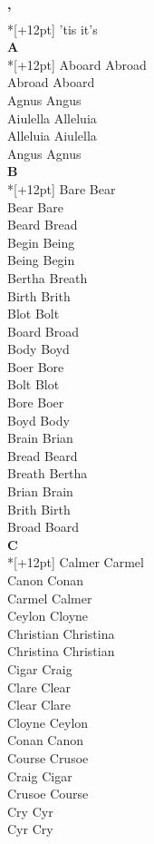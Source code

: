 
\vspace{14pt}
\noindent\textbf{\Large '}\\*[+12pt]
'tis it's\\

\vspace{14pt}
\noindent\textbf{\Large A}\\*[+12pt]
Aboard Abroad\\
Abroad Aboard\\
Agnus Angus\\
Aiulella Alleluia\\
Alleluia Aiulella\\
Angus Agnus\\

\vspace{14pt}
\noindent\textbf{\Large B}\\*[+12pt]
Bare Bear\\
Bear Bare\\
Beard Bread\\
Begin Being\\
Being Begin\\
Bertha Breath\\
Birth Brith\\
Blot Bolt\\
Board Broad\\
Body Boyd\\
Boer Bore\\
Bolt Blot\\
Bore Boer\\
Boyd Body\\
Brain Brian\\
Bread Beard\\
Breath Bertha\\
Brian Brain\\
Brith Birth\\
Broad Board\\

\vspace{14pt}
\noindent\textbf{\Large C}\\*[+12pt]
Calmer Carmel\\
Canon Conan\\
Carmel Calmer\\
Ceylon Cloyne\\
Christian Christina\\
Christina Christian\\
Cigar Craig\\
Clare Clear\\
Clear Clare\\
Cloyne Ceylon\\
Conan Canon\\
Course Crusoe\\
Craig Cigar\\
Crusoe Course\\
Cry Cyr\\
Cyr Cry\\

